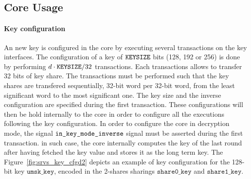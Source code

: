 \documentclass{scrartcl}
\begin{document}
\subsection{Core Usage}

\paragraph{Key configuration}
An new key is configured in the core by executing several transactions on the
key interfaces.  The configuration of a key of $\texttt{KEYSIZE}$ bits (128, 192 or
256) is done by performing $d\cdot\texttt{KEYSIZE} / 32$ transactions.  Each
transactions allows to transfer 32 bits of key share. The transactions must be
performed such that the key shares are transfered sequentially, 32-bit word per
32-bit word, from the least significant word to the most significant one. The
key size and the inverse configuration are specified during the first
transaction. These configurations will then be hold internally to the core in
order to configure all the executions following the key configuration. In order
to configure the core in decryption mode, the signal $\texttt{in\_key\_mode\_inverse}$
signal must be asserted during the first transaction. in such case, the core
internally computes the key of the last round after having fetched the key
value and stores it as the long term key.  
The Figure~\ref{fig:srvs_key_cfgd2} depicts an example of key configuration for the 128-bit key
$\texttt{umsk\_key}$, encoded in the 2-shares sharings $\texttt{share0\_key}$ and
$\texttt{share1\_key}$.   
\end{document}

